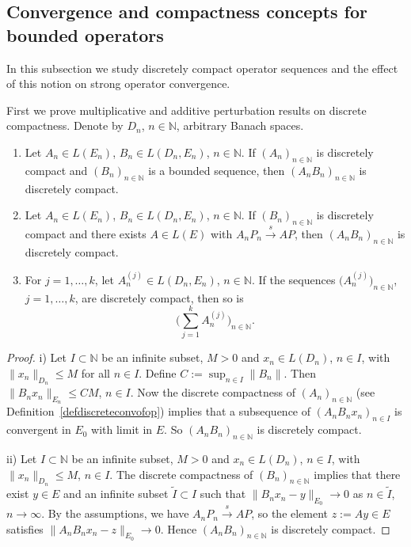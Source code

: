 \documentclass[a4paper,reqno]{amsart}
\begin{document}
{\subsection{Convergence and compactness concepts for bounded operators}\label{subsectionbounded}
In this subsection we study discretely compact operator sequences and the effect of this notion on strong operator convergence.

First we prove multiplicative and additive perturbation results on discrete compactness. 
Denote by $D_n$, $n\in{\mathbb{N}}$, arbitrary Banach spaces.

\begin{lemma}\label{lemmapertdisccomp}
 \begin{enumerate}[label=\rm{\roman{*})}]
  \item Let $A_n\in L(E_n)$, $B_n\in L(D_n,E_n)$, $n\in{\mathbb{N}}$. If $(A_n)_{n\in{\mathbb{N}}}$ is discretely compact and $(B_n)_{n\in{\mathbb{N}}}$ is a bounded sequence, then $(A_nB_n)_{n\in{\mathbb{N}}}$ is discretely compact.
  \item Let  $A_n\in L(E_n)$, $B_n\in L(D_n,E_n)$, $n\in{\mathbb{N}}$. If $(B_n)_{n\in{\mathbb{N}}}$ is discretely compact and there exists $A\in L(E)$ with $A_nP_n{\stackrel{s}{\rightarrow}} AP$, then $(A_nB_n)_{n\in{\mathbb{N}}}$ is discretely compact.
  \item For $j=1,\dots,k$, let $A_n^{(j)}\in L(D_n,E_n)$, $n\in{\mathbb{N}}$. If the sequences $\big(A_n^{(j)}\big)_{n\in{\mathbb{N}}}$, $j=1,\dots,k$, are discretely compact, then so is \vspace{-1mm}$$\bigg(\sum_{j=1}^k A_n^{(j)}\bigg)_{n\in{\mathbb{N}}}.$$
 \end{enumerate}
\end{lemma}
\begin{proof}
i) Let $I\subset{\mathbb{N}}$ be an infinite subset, $M>0$ and $x_n\in L(D_n)$, $n\in I$, with $\|x_n\|_{D_n}\leq M$ for all  $n\in I$. Define $C:=\sup_{n\in I}\|B_n\|$.
Then $\|B_nx_n\|_{E_n}\leq CM$, $n\in I$. Now the discrete compactness of $(A_n)_{n\in{\mathbb{N}}}$ (see Definition~\ref{defdiscreteconvofop}) implies that a subsequence of $(A_nB_nx_n)_{n\in I}$ is convergent in $E_0$ with limit in $E$.
So $(A_nB_n)_{n\in{\mathbb{N}}}$ is discretely compact.

ii) Let $I\subset{\mathbb{N}}$ be an infinite subset, $M>0$ and $x_n\in L(D_n)$, $n\in I$, with $\|x_n\|_{D_n}\leq M$,  $n\in I$.
The discrete compactness of $(B_n)_{n\in{\mathbb{N}}}$ implies that there exist $y\in E$ and an infinite subset $\widetilde I\subset I$ such that $\|B_nx_n-y\|_{E_0}\to 0$ as $n\in \widetilde I$, $n\to\infty$.
By the assumptions, we have $A_nP_n{\stackrel{s}{\rightarrow}} AP$, so the element $z:=Ay\in E$ satisfies $\|A_nB_nx_n-z\|_{E_0}\to 0$. Hence $(A_nB_n)_{n\in {\mathbb{N}}}$ is discretely compact.


\end{proof}}
\end{document}
